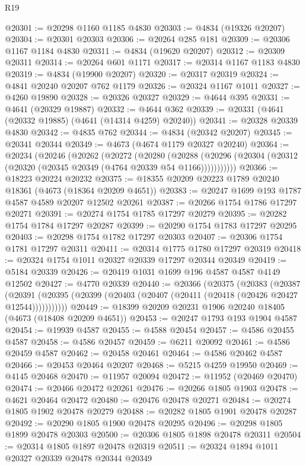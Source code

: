 \begin{lexlean}{R19}
\begin{coremodule}
@20301 := @20298 @1160 @1185 @4830
@20303 := @4834 (@19326 @20207)
@20304 := @20301 @20303
@20306 := @20264 @285 @181
@20309 := @20306 @1167 @1184 @4830
@20311 := @4834 (@19620 @20207)
@20312 := @20309 @20311
@20314 := @20264 @601 @1171
@20317 := @20314 @1167 @1183 @4830
@20319 := @4834 (@19900 @20207)
@20320 := @20317 @20319
@20324 := @4841 @20240 @20207 @762 @1179
@20326 := @20324 @1167 @1011
@20327 := @4260 @19890
@20328 := @20326 @20327
@20329 := @4644 @395
@20331 := @4641 (@20329 @19887)
@20332 := @4644 @362
@20339 := @20331 (@4641 (@20332 @19885) (@4641 (@14314 @4259) @20240))
@20341 := @20328 @20339 @4830
@20342 := @4835 @762
@20344 := @4834 (@20342 @20207)
@20345 := @20341 @20344
@20349 := @4673 (@4674 @1179 @20327 @20240)
@20364 := @20234
    (@20246
      (@20262
        (@20272
          (@20280
            (@20288
              (@20296 (@20304 (@20312 (@20320 (@20345 @20349 (@4764 @20339 @54 @1166)))))))))))
@20366 := @18223 @20224 @20232
@20375 := @18355 @20209 @20223 @1789 @20240 @18361 (@4673 (@18364 @20209 @4651))
@20383 := @20247 @1699 @193 @1787 @4587 @4589 @20207 @12502 @20261
@20387 := @20266 @1754 @1786 @17297 @20271
@20391 := @20274 @1754 @1785 @17297 @20279
@20395 := @20282 @1754 @1784 @17297 @20287
@20399 := @20290 @1754 @1783 @17297 @20295
@20403 := @20298 @1754 @1782 @17297 @20303
@20407 := @20306 @1754 @1781 @17297 @20311
@20411 := @20314 @1775 @1780 @17297 @20319
@20418 := @20324 @1754 @1011 @20327 @20339 @17297 @20344 @20349
@20419 := @5184 @20339
@20426 := @20419 @1031 @1699 @196 @4587 @4587 @4149 @12502
@20427 := @4770 @20339
@20440 := @20366
    (@20375
      (@20383
        (@20387
          (@20391 (@20395 (@20399 (@20403 (@20407 (@20411 (@20418 (@20426 @20427 @12544)))))))))))
@20449 := @18399 @20209 @20231 @1906 @20240 @18405 (@4673 (@18408 @20209 @4651))
@20453 := @20247 @1793 @193 @1904 @4587
@20454 := @19939 @4587
@20455 := @4588 @20454
@20457 := @4586 @20455 @4587
@20458 := @4586 @20457
@20459 := @6211 @20092
@20461 := @4586 @20459 @4587
@20462 := @20458 @20461
@20464 := @4586 @20462 @4587
@20466 := @20453 @20464 @20207
@20468 := @5215 @4259 @19950
@20469 := @4145 @20468
@20470 := @11957 @20094
@20472 := @11952 (@20469 @20470)
@20474 := @20466 @20472 @20261
@20476 := @20266 @1805 @1903
@20478 := @4621 @20464 @20472
@20480 := @20476 @20478 @20271
@20484 := @20274 @1805 @1902 @20478 @20279
@20488 := @20282 @1805 @1901 @20478 @20287
@20492 := @20290 @1805 @1900 @20478 @20295
@20496 := @20298 @1805 @1899 @20478 @20303
@20500 := @20306 @1805 @1898 @20478 @20311
@20504 := @20314 @1805 @1897 @20478 @20319
@20511 := @20324 @1894 @1011 @20327 @20339 @20478 @20344 @20349

\end{coremodule}
\end{lexlean}
